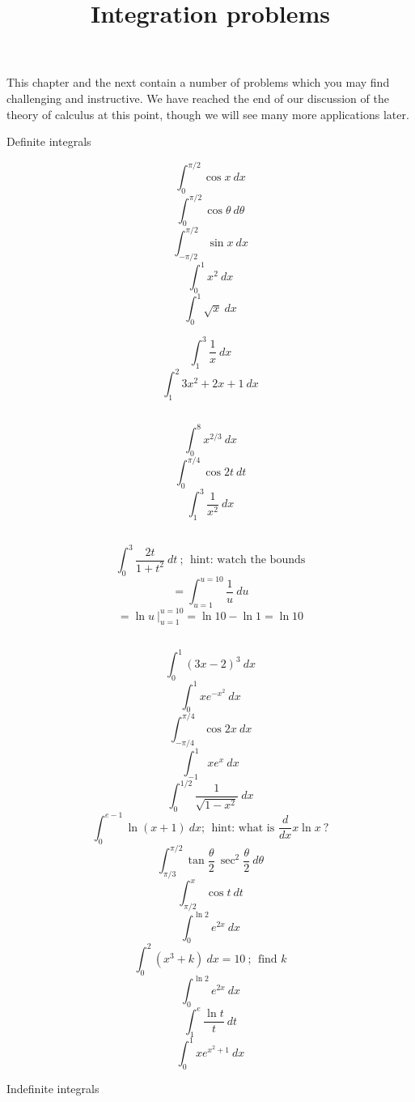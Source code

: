 \documentclass[11pt, oneside]{article}
\title{Integration problems}
\date{}
\begin{document}
\maketitle
\Large


This chapter and the next contain a number of problems which you may find challenging and instructive.  We have reached the end of our discussion of the theory of calculus at this point, though we will see many more applications later.

Definite integrals

\[ \int_{0}^{\pi/2} \cos x \ dx \]
\[ \int_{0}^{\pi/2} \cos \theta \ d\theta \]
\[ \int_{-\pi/2}^{\pi/2} \sin x \ dx \]
\[ \int_0^1 x^2 \ dx \]
\[ \int_0^1 \sqrt{x} \ dx \]

\[ \int_1^{3} \frac{1}{x} \ dx \]
\[ \int_1^2 3x^2 + 2x + 1 \ dx \]

\subsection*{}

\[ \int_{0}^{8} x^{2/3} \ dx \]
\[ \int_{0}^{\pi/4}  \cos 2t \ dt \]
\[ \int_{1}^3 \frac{1}{x^2} \ dx \]

\subsection*{}

\[ \int_0^3 \frac{2t}{1+t^2} \ dt \ ; \ \ \text{hint:  watch the bounds} \]
\[ = \int_{u=1}^{u=10} \frac{1}{u} \ du \]
\[ = \ln u \ \bigg |_{u=1}^{u=10} = \ln 10 - \ln 1 = \ln 10 \]

\subsection*{}

\[ \int_0^1 (3x - 2)^3 \ dx \]
\[ \int_0^1 xe^{-x^2} \ dx \]
\[ \int_{-\pi/4}^{\pi/4} \cos 2x \ dx \]
\[ \int_{-1}^1 xe^x \ dx \]
\[ \int_0^{1/2} \frac{1}{\sqrt{1-x^2}} \ dx \]
\[ \int_0^{e-1} \ln (x + 1) \ dx ; \ \ \text{hint: what is } \frac{d}{dx} x \ln x \ \text{?}\]
\[ \int_{\pi/3}^{\pi/2} \tan \frac{\theta}{2} \ \sec^2 \frac{\theta}{2}\ d \theta \]
\[ \int_{\pi/2}^{x} \cos t \ dt \]
\[ \int_0^{\ln 2} e^{2x} \ dx \]
\[ \int_0^2 (x^3 + k) \ dx = 10 \ ; \ \ \text{find } k \]
\[ \int_0^{\ln 2} e^{2x} \ dx \]
\[ \int_1^e \frac{\ln t}{t} \ dt \]
\[ \int_0^1 x e^{x^2 + 1} \ dx \]

Indefinite integrals
\end{document}
